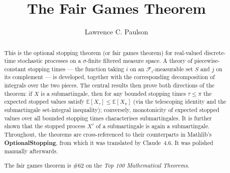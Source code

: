 \documentclass[11pt,a4paper]{article}
\begin{document}
\title{The Fair Games Theorem}
\author{Lawrence C. Paulson}
\maketitle

\begin{abstract}
This is the optional stopping theorem (or fair games theorem) for real-valued discrete-time stochastic
processes on a $\sigma$-finite filtered measure space. A
theory of piecewise-constant stopping times --- the function taking $i$ on
an $\mathcal F_i$-measurable set $S$ and $j$ on its complement --- is
developed, together with the corresponding decomposition of integrals over the
two pieces. The central results then prove both directions of the theorem: if
$X$ is a submartingale, then for any bounded stopping times $\tau \le \pi$
the expected stopped values satisfy $\mathbb E[X_\tau] \le \mathbb E[X_\pi]$
(via the telescoping identity and the submartingale set-integral inequality);
conversely, monotonicity of expected stopped values over all bounded stopping
times characterises submartingales. It is further shown that the stopped process $X^\tau$ of
a submartingale is again a submartingale. Throughout, the theorems are
cross-referenced to their counterparts in Mathlib's \textbf{OptionalStopping},
from which it was translated by Claude~4.6. It was polished manually afterwards.

The fair games theorem is \#62 on the \emph{Top 100 Mathematical Theorems}.
\end{abstract}

\tableofcontents

\newpage




\end{document}
